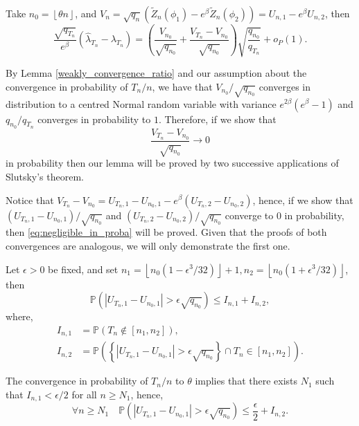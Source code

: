 \documentclass[sn-mathphys-ay]{sn-jnl}%
\renewcommand{\P}{\mathbb{P}}
\begin{document}
\begin{appendices}
Take $n_0=\left\lfloor \theta n \right\rfloor$, and $V_n=\sqrt{q_n}({{{\widetilde
                Z}_n}\left( {{\phi _1}} \right) - e^\beta{{\widetilde Z}_n}\left( {{\phi _2}}
        \right)})=U_{n,1}-e^\beta U_{n,2}$, then
\begin{equation*}
    \frac{\sqrt{q_{T_n}}}{e^\beta}\left({\widehat \lambda_{T_n}} - {\lambda_{T_n}}\right) = \left( \frac{V_{n_0}}{\sqrt{q_{n_0}}} + \frac{V_{T_n}-V_{n_0}}{\sqrt{q_{n_0}}} \right)\sqrt{\frac{q_{n_0}}{q_{T_n}}} + o_P(1).
\end{equation*}

By Lemma \ref{weakly_convergence_ratio} and our assumption about the convergence in
probability of ${T_n}/{n}$, we have that ${V_{n_0}}/{\sqrt{q_{n_0}}}$ converges in
distribution to a centred Normal random variable with variance $e^{2\beta }( {e^\beta
        } - 1)$ and ${q_{n_0}}/{q_{T_n}}$ converges in probability to $1$. Therefore, if we
show that
\begin{equation}\label{eq:negligible_in_proba}
    \frac{V_{T_n}-V_{n_0}}{\sqrt{q_{n_0}}}\mathop  \to 0
\end{equation}
in probability then our lemma will be proved by two successive applications of Slutsky's theorem.

Notice that
$V_{T_n}-V_{n_0}=U_{T_n,1}-U_{n_0,1}-e^\beta\left(U_{T_n,2}-U_{n_0,2}\right)$, hence,
if we show that ${(U_{T_n,1}-U_{n_0,1})}/{\sqrt{q_{n_0}}}$ and
${(U_{T_n,2}-U_{n_0,2})}/{\sqrt{q_{n_0}}}$ converge to 0 in probability, then
\eqref{eq:negligible_in_proba} will be proved. Given that the proofs of both
convergences are analogous, we will only demonstrate the first one.

Let $\epsilon>0$ be fixed, and set $n_1=\left\lfloor
    n_0\left(1-{\epsilon^3}/{32}\right) \right\rfloor+1, n_2=\left\lfloor
    n_0\left(1+{\epsilon^3}/{32}\right) \right\rfloor$, then
\begin{equation}
    \P\left(\left| U_{T_n,1}-U_{n_0,1} \right|>\epsilon \sqrt{q_{n_0}}\right)\leq I_{n,1}+I_{n,2},
\end{equation}
where,
\begin{align*}
    I_{n,1} & = \P\left( T_n\notin[n_1,n_2] \right),                                                                            \\
    I_{n,2} & = \P\left(\left\{ \left| U_{T_n,1}-U_{n_0,1} \right|>\epsilon \sqrt{q_{n_0}} \right\}\cap T_n\in[n_1,n_2]\right).
\end{align*}

The convergence in probability of ${T_n}/{n}$ to $\theta$ implies that there exists
$N_1$ such that $I_{n,1}<{\epsilon}/{2}$ for all $n\geq N_1$, hence,
\begin{equation}\label{eq:probability_reminder}
    \forall n\geq N_1\quad\P\left(\left| U_{T_n,1}-U_{n_0,1} \right|>\epsilon \sqrt{q_{n_0}}\right)\leq \frac{\epsilon}{2}+I_{n,2}.
\end{equation}


\end{appendices}
\end{document}
